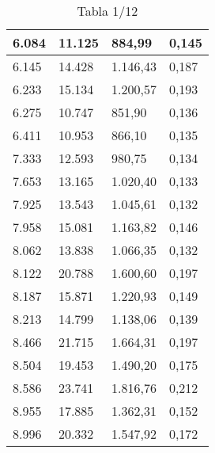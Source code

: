 \begin{table}[H]
{\begin{tabular}{| l | l | l |l |}
6.084	&	11.125	&	884,99	&	0,145	\\ \hline
6.145	&	14.428	&	1.146,43	&	0,187	\\ \hline
6.233	&	15.134	&	1.200,57	&	0,193	\\ \hline
6.275	&	10.747	&	851,90	&	0,136	\\ \hline
6.411	&	10.953	&	866,10	&	0,135	\\ \hline
7.333	&	12.593	&	980,75	&	0,134	\\ \hline
7.653	&	13.165	&	1.020,40	&	0,133	\\ \hline
7.925	&	13.543	&	1.045,61	&	0,132	\\ \hline
7.958	&	15.081	&	1.163,82	&	0,146	\\ \hline
8.062	&	13.838	&	1.066,35	&	0,132	\\ \hline
8.122	&	20.788	&	1.600,60	&	0,197	\\ \hline
8.187	&	15.871	&	1.220,93	&	0,149	\\ \hline
8.213	&	14.799	&	1.138,06	&	0,139	\\ \hline
8.466	&	21.715	&	1.664,31	&	0,197	\\ \hline
8.504	&	19.453	&	1.490,20	&	0,175	\\ \hline
8.586	&	23.741	&	1.816,76	&	0,212	\\ \hline
8.955	&	17.885	&	1.362,31	&	0,152	\\ \hline
8.996	&	20.332	&	1.547,92	&	0,172	\\ \hline
  \end{tabular}
   \caption*{Tabla 1/12}
}
\end{table}
